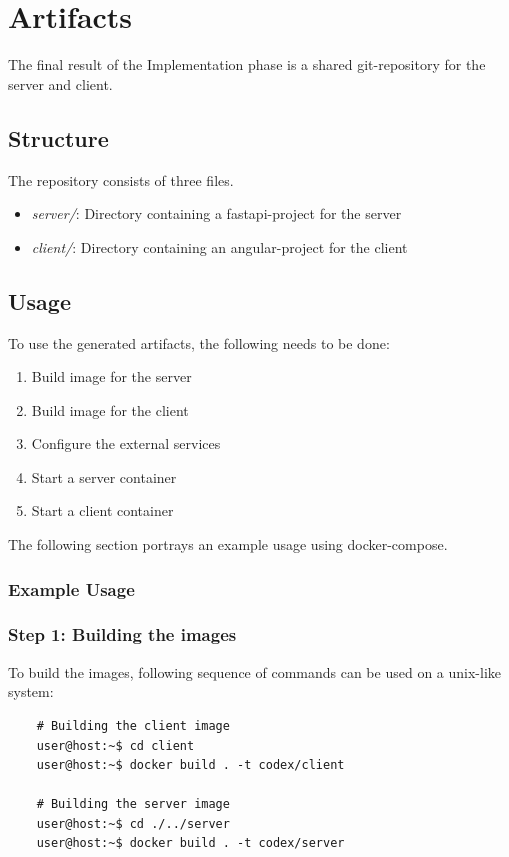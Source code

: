\chapter{Artifacts}
The final result of the Implementation phase is a shared git-repository for the server and client.

\section{Structure}
The repository consists of three files.
\begin{itemize}
    \item \textit{server/}: Directory containing a fastapi-project for the server
    \item \textit{client/}: Directory containing an angular-project for the client
\end{itemize}

\section{Usage}
To use the generated artifacts, the following needs to be done:
\begin{enumerate}
    \item Build image for the server
    \item Build image for the client
    \item Configure the external services
    \item Start a server container
    \item Start a client container
\end{enumerate}

The following section portrays an example usage using docker-compose.

\subsection{Example Usage}
\subsection{Step 1: Building the images}
To build the images, following sequence of commands can be used on a unix-like system:
\begin{verbatim}
    # Building the client image
    user@host:~$ cd client
    user@host:~$ docker build . -t codex/client

    # Building the server image
    user@host:~$ cd ./../server
    user@host:~$ docker build . -t codex/server
\end{verbatim}

